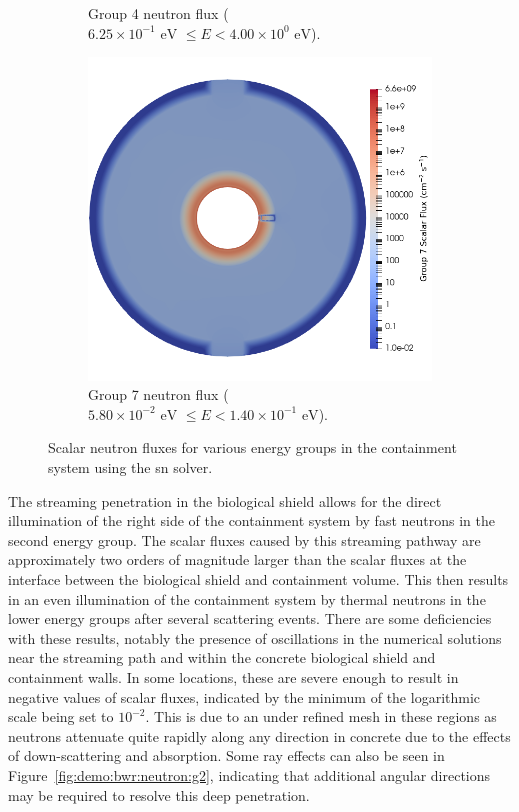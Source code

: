 \begin{figure}[H]
\begin{subfigure}[b]{0.495\textwidth}
        \caption{Group 4 neutron flux ($6.25\times 10^{-1}\text{ eV } \leq E < 4.00\times 10^{0}\text{ eV}$).}
        \label{fig:demo:bwr:neutron:g4}
    \end{subfigure}
    \hfill
    \begin{subfigure}[b]{0.495\textwidth}
        \centering
        \includegraphics[width=\textwidth]{images/demos/bwr_shield/neutron_field/group_7.png}
        \caption{Group 7 neutron flux ($5.80\times 10^{-2}\text{ eV } \leq E < 1.40\times 10^{-1}\text{ eV}$).}
        \label{fig:demo:bwr:neutron:g7}
    \end{subfigure}
    \caption{Scalar neutron fluxes for various energy groups in the containment system using the \acrshort{sn} solver.}
    \label{fig:demo:bwr:neutron}
\end{figure}

The streaming penetration in the biological shield allows for the direct illumination of the right side of the containment system by fast neutrons in the second energy group. The scalar fluxes caused by this streaming pathway are approximately two orders of magnitude larger than the scalar fluxes at the interface between the biological shield and containment volume. This then results in an even illumination of the containment system by thermal neutrons in the lower energy groups after several scattering events. There are some deficiencies with these results, notably the presence of oscillations in the numerical solutions near the streaming path and within the concrete biological shield and containment walls. In some locations, these are severe enough to result in negative values of scalar fluxes, indicated by the minimum of the logarithmic scale being set to $10^{-2}$. This is due to an under refined mesh in these regions as neutrons attenuate quite rapidly along any direction in concrete due to the effects of down-scattering and absorption. Some ray effects can also be seen in Figure~\ref{fig:demo:bwr:neutron:g2}, indicating that additional angular directions may be required to resolve this deep penetration.

